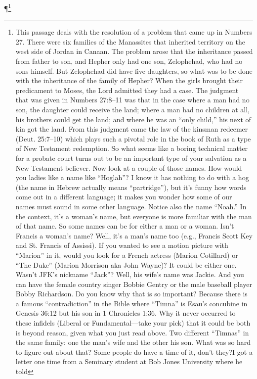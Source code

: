 \P  \footnote{This passage deals with the resolution of a
problem that came up in Numbers 27. There
were six families of the Manassites that
inherited territory on the west side of Jordan in
Canaan. The problem arose that the inheritance
passed from father to son, and Hepher only had
one son, Zelophehad, who had no sons himself.
But Zelophehad did have five daughters, so
what was to be done with the inheritance of the
family of Hepher?
When the girls brought their predicament to
Moses, the Lord admitted they had a case. The
judgment that was given in Numbers 27:8–11
was that in the case where a man had no son,
the daughter could receive the land; where a
man had no children at all, his brothers could
get the land; and where he was an “only child,”
his next of kin got the land. From this judgment
came the law of the kinsman redeemer (Deut.
25:7–10) which plays such a pivotal role in the
book of Ruth as a type of New Testament
redemption. So what seems like a boring
technical matter for a probate court turns out to
be an important type of your salvation as a New
Testament believer.
Now look at a couple of those names. How
would you ladies like a name like “Hoglah”? I
know it has nothing to do with a hog (the name
in Hebrew actually means “partridge”), but it’s
funny how words come out in a different
language; it makes you wonder how some of
our names must sound in some other language.
Notice also the name “Noah.” In the
context, it’s a woman’s name, but everyone is
more familiar with the man of that name. So
some names can be for either a man or a
woman. Isn’t Francis a woman’s name? Well,
it’s a man’s name too (e.g., Francis Scott Key
and St. Francis of Assissi). If you wanted to see
a motion picture with “Marion” in it, would you
look for a French actress (Marion Cotillard) or
“The Duke” (Marion Morrison aka John
Wayne)? It could be either one. Wasn’t JFK’s
nickname “Jack”? Well, his wife’s name was
Jackie. And you can have the female country
singer Bobbie Gentry or the male baseball
player Bobby Richardson.
Do you know why that is so important?
Because there is a famous “contradiction” in the
Bible where “Timna” is Esau’s concubine in
Genesis 36:12 but his son in 1 Chronicles 1:36.
Why it never occurred to these infidels (Liberal
or Fundamental—take your pick) that it could
be both is beyond reason, given what you just
read above. Two different “Timnas” in the
same family: one the man’s wife and the other
his son. What was so hard to figure out about
that? Some people do have a time of it, don’t
they?I got a letter one time from a Seminary
student at Bob Jones University where he told
}
